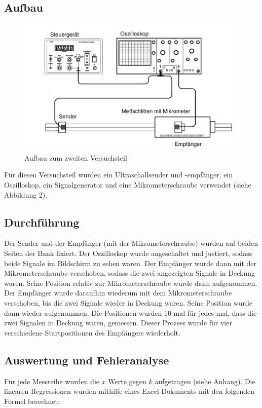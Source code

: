 \documentclass[11pt,a4paper]{article}
\begin{document}
\subsection{Aufbau}
\begin{figure}
	\centering
	\includegraphics[scale=0.5]{Abb2}
	\caption{Aufbau zum zweiten Versuchsteil}
\end{figure}

Für diesen Versuchsteil wurden ein Ultraschallsender und -empfänger, ein Oszilloskop, ein Signalgenerator und eine Mikrometerschraube verwendet (siehe Abbildung 2). 

\subsection{Durchführung}
Der Sender und der Empfänger (mit der Mikrometerschraube) wurden auf beiden Seiten der Bank fixiert. Der Oszilloskop wurde angeschaltet und justiert, sodass beide Signale im Bildschirm zu sehen waren. Der Empfänger wurde dann mit der Mikrometerschraube verschoben, sodass die zwei angezeigten Signale in Deckung waren. Seine Position relativ zur Mikrometerschraube wurde dann aufgenommen. Der Empfänger wurde daraufhin wiederum mit dem Mikrometerschraube verschoben, bis die zwei Signale wieder in Deckung waren. Seine Position wurde dann wieder aufgenommen. Die Positionen wurden 10-mal für jedes mal, dass die zwei Signalen in Deckung waren, gemessen. Dieser Prozess wurde für vier verschiedene Startpositionen des Empfängers wiederholt. 



\subsection{Auswertung und Fehleranalyse}
Für jede Messreihe wurden die $x$ Werte gegen $k$ aufgetragen (siehe Anhang). Die linearen Regressionen wurden mithilfe eines Excel-Dokuments mit den folgenden Formel berechnet: 
\end{document}
